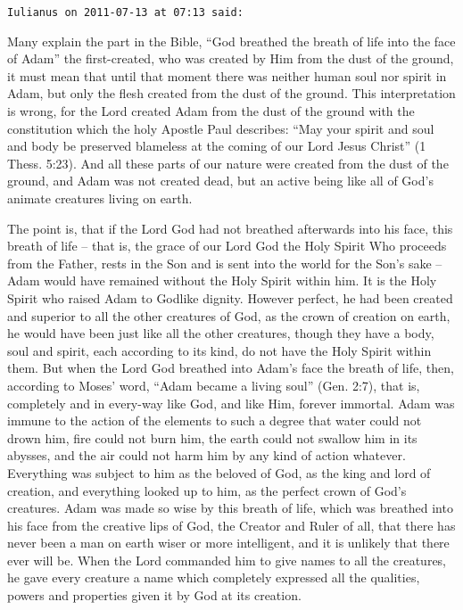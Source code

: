 \begin{footnotesize}\begin{sffamily}

\texttt{Iulianus on 2011-07-13 at 07:13 said: }

Many explain the part in the Bible, “God breathed the breath of life into the face of Adam” the first-created, who was created by Him from the dust of the ground, it must mean that until that moment there was neither human soul nor spirit in Adam, but only the flesh created from the dust of the ground. This interpretation is wrong, for the Lord created Adam from the dust of the ground with the constitution which the holy Apostle Paul describes: “May your spirit and soul and body be preserved blameless at the coming of our Lord Jesus Christ” (1 Thess. 5:23). And all these parts of our nature were created from the dust of the ground, and Adam was not created dead, but an active being like all of God's animate creatures living on earth.

The point is, that if the Lord God had not breathed afterwards into his face, this breath of life – that is, the grace of our Lord God the Holy Spirit Who proceeds from the Father, rests in the Son and is sent into the world for the Son's sake – Adam would have remained without the Holy Spirit within him. It is the Holy Spirit who raised Adam to Godlike dignity. However perfect, he had been created and superior to all the other creatures of God, as the crown of creation on earth, he would have been just like all the other creatures, though they have a body, soul and spirit, each according to its kind, do not have the Holy Spirit within them. But when the Lord God breathed into Adam's face the breath of life, then, according to Moses' word, “Adam became a living soul” (Gen. 2:7), that is, completely and in every-way like God, and like Him, forever immortal. Adam was immune to the action of the elements to such a degree that water could not drown him, fire could not burn him, the earth could not swallow him in its abysses, and the air could not harm him by any kind of action whatever. Everything was subject to him as the beloved of God, as the king and lord of creation, and everything looked up to him, as the perfect crown of God's creatures. Adam was made so wise by this breath of life, which was breathed into his face from the creative lips of God, the Creator and Ruler of all, that there has never been a man on earth wiser or more intelligent, and it is unlikely that there ever will be. When the Lord commanded him to give names to all the creatures, he gave every creature a name which completely expressed all the qualities, powers and properties given it by God at its creation.


\end{sffamily}
\end{footnotesize}
